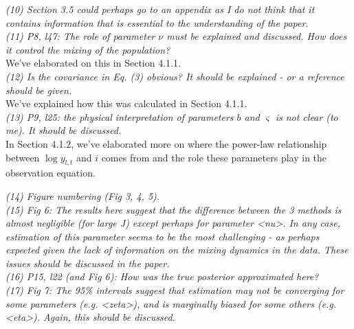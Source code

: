 \documentclass{article}
\begin{document}
\noindent \emph{(10) Section 3.5 could perhaps go to an appendix as I do not think that it contains information that is essential to the understanding of the paper.} \\

\noindent \emph{(11) P8, l47: The role of parameter $\nu$ must be explained and discussed. How does it control the mixing of the population?} \\

We've elaborated on this in Section 4.1.1. \\

\noindent \emph{(12) Is the covariance in Eq. (3) obvious? It should be explained - or a reference should be given.} \\

We've explained how this was calculated in Section 4.1.1. \\

\noindent \emph{(13) P9, l25: the physical interpretation of parameters $b$ and $\varsigma$ is not clear (to me). It should be discussed.} \\

In Section 4.1.2, we've elaborated more on where the power-law relationship between $\log y_{l,t}$ and $i$ comes from and the role these parameters play in the observation equation.

\noindent \emph{(14) Figure numbering (Fig 3, 4, 5).} \\

\noindent \emph{(15) Fig 6: The results here suggest that the difference between the 3 methods is almost negligible (for large J) except perhaps for parameter <nu>. In any case, estimation of this parameter seems to be the most challenging - as perhaps expected given the lack of information on the mixing dynamics in the data. These issues should be discussed in the paper.} \\

\noindent \emph{(16) P15, l22 (and Fig 6): How was the true posterior approximated here?} \\

\noindent \emph{(17) Fig 7: The 95\% intervals suggest that estimation may not be converging for some parameters (e.g. <zeta>), and is marginally biased for some others (e.g. <eta>). Again, this should be discussed.} \\
\end{document}
